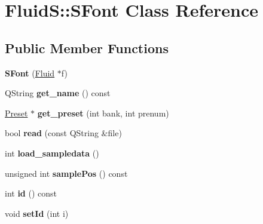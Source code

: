\hypertarget{class_fluid_s_1_1_s_font}{}\section{FluidS\+:\+:S\+Font Class Reference}
\label{class_fluid_s_1_1_s_font}
\subsection*{Public Member Functions}
\begin{DoxyCompactItemize}
\item 
\mbox{\label{class_fluid_s_1_1_s_font_a7682fd15d57bd9a4d7b2afa3810e6578}} 
{\bfseries S\+Font} (\hyperlink{class_fluid_s_1_1_fluid}{Fluid} $\ast$f)
\item 
\mbox{\label{class_fluid_s_1_1_s_font_a471aa55e047bccef09c11f34fa49768d}} 
Q\+String {\bfseries get\+\_\+name} () const
\item 
\mbox{\label{class_fluid_s_1_1_s_font_af6baf80134ec0a9bef338c76cdcc2b0a}} 
\hyperlink{class_fluid_s_1_1_preset}{Preset} $\ast$ {\bfseries get\+\_\+preset} (int bank, int prenum)
\item 
\mbox{\label{class_fluid_s_1_1_s_font_a22b8290f9a6816d2b99e810377341fa1}} 
bool {\bfseries read} (const Q\+String \&file)
\item 
\mbox{\label{class_fluid_s_1_1_s_font_ab40622062069850eb20cafcb353d9579}} 
int {\bfseries load\+\_\+sampledata} ()
\item 
\mbox{\label{class_fluid_s_1_1_s_font_a9920354bff9998f65c0cc45781c7c990}} 
unsigned int {\bfseries sample\+Pos} () const
\item 
\mbox{\label{class_fluid_s_1_1_s_font_aa5ccfa2730e98a2eda870cc409078a67}} 
int {\bfseries id} () const
\item 
\mbox{\label{class_fluid_s_1_1_s_font_a6115018ae3b53a8a61e07ef03eccca25}} 
void {\bfseries set\+Id} (int i)
\item 

\end{DoxyCompactItemize}
